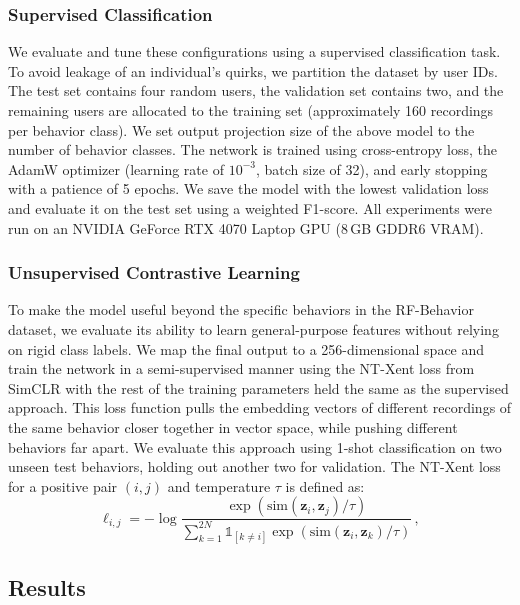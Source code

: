 \documentclass{article}
\begin{document}
\subsubsection{Supervised Classification}

We evaluate and tune these configurations using a supervised classification task. To avoid leakage of an individual's quirks, we partition the dataset by user IDs. The test set contains four random users, the validation set contains two, and the remaining users are allocated to the training set (approximately 160 recordings per behavior class). We set output projection size of the above model to the number of behavior classes. The network is trained using cross-entropy loss, the AdamW optimizer (learning rate of $10^{-3}$, batch size of 32), and early stopping with a patience of 5 epochs. We save the model with the lowest validation loss and evaluate it on the test set using a weighted F1-score. All experiments were run on an NVIDIA GeForce RTX 4070 Laptop GPU (8\,GB GDDR6 VRAM).

\subsubsection{Unsupervised Contrastive Learning}

To make the model useful beyond the specific behaviors in the RF-Behavior dataset, we evaluate its ability to learn general-purpose features without relying on rigid class labels. We map the final output to a 256-dimensional space and train the network in a semi-supervised manner using the NT-Xent loss from SimCLR \cite{chen2020simple} with the rest of the training parameters held the same as the supervised approach. This loss function pulls the embedding vectors of different recordings of the same behavior closer together in vector space, while pushing different behaviors far apart. We evaluate this approach using 1-shot classification on two unseen test behaviors, holding out another two for validation. The NT-Xent loss for a positive pair $(i, j)$ and temperature $\tau$ is defined as:
\begin{equation}
    \ell_{i,j} = -\log \frac{\exp(\text{sim}(\mathbf{z}_i, \mathbf{z}_j)/\tau)}{\sum_{k=1}^{2N} \mathbb{1}_{[k \neq i]} \exp(\text{sim}(\mathbf{z}_i, \mathbf{z}_k)/\tau)} \,,
\end{equation}

\subsection{Results}
\end{document}
